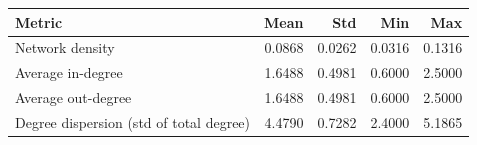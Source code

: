 \begin{tabular}{p{} r r r r}
\toprule
Metric & Mean & Std & Min & Max \\
\midrule
Network density & 0.0868 & 0.0262 & 0.0316 & 0.1316 \\
Average in-degree & 1.6488 & 0.4981 & 0.6000 & 2.5000 \\
Average out-degree & 1.6488 & 0.4981 & 0.6000 & 2.5000 \\
Degree dispersion (std of total degree) & 4.4790 & 0.7282 & 2.4000 & 5.1865 \\
\bottomrule
\end{tabular}
